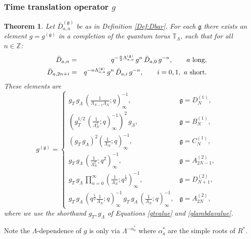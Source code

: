 \documentclass[12pt]{amsart}
\newtheorem{thm}{Theorem}[section]
\newcommand{\barD}{\bar D}
\newcommand{\g}{{\mathfrak{g}}}
\newcommand{\Z}{{\mathbb Z}}
\newcommand{\lL}{{\Lambda}}
\numberwithin{equation}{section}
\begin{document}
\subsubsection{Time translation operator $g$}
%
%
%
%
%
\begin{thm}\label{longshort}
Let $\barD_{a,n}^{(\g)}$ be as in Definition \ref{Def:Dbar}.
For each $\g$ there exists an element $g=g^{(\g)}$ in a completion of the quantum torus ${\mathbb T}_\lL$, such that for all $n\in \Z$:
\begin{eqnarray}
\barD_{a,n}&=&q^{-\frac{n}{2}\lL^{(\g)}_{a,a}}\, g^n\, \barD_{a,0} \, g^{-n} , \qquad \hbox{$a$ long},\label{evolutlong}\\
\barD_{a,2n+i}&=&q^{-n\lL^{(\g)}_{a,a}}\, g^n\, \barD_{a,i} \, g^{-n},\qquad i=0,1\label{evolutshort} , \ \hbox{$a$ short}.
\end{eqnarray}
These elements are
%
\begin{equation}
\renewcommand{\arraystretch}{2.5}
g^{(\g)} =\left\{
\begin{array}{ll}
g_T\, g_\lL \,  \left(\frac{1}{\lL_{N-1}\lL_N};q\right)^{-1}_\infty, & \g=D_N^{(1)},\\
\left(g_T^{1/2}\,  \left(\frac{1}{\lL_N^2};q\right)^{-1}_\infty \right)^2\, g_\lL,&  \g=B_N^{(1)},  \\
(g_T \,g_\lL)^2  \left(\frac{1}{\lL_N};q\right)^{-1}_\infty, & \g=C_N^{(1)}, \\
g_T\, g_\lL\,  \left(\frac{1}{\lL_N^2};q^2\right)^{-1}_\infty, &  \g=A_{2N-1}^{(2)} ,\\
g_T\, g_\lL\, \prod_{n=0}^\infty \left(\frac{1}{\lL_N};q^{\frac12}\right)_\infty^{-1}, &  \g=D_{N+1}^{(2)},\\
 g_T\, g_\lL\, \left(q^{\frac{1}{2}}\frac{1}{\lL_N};q\right)^{-1}_\infty\,
g_T\, g_\lL\, \left(\frac{1}{\lL_N};q\right)_\infty^{-1}, & \g=A_{2N}^{(2)} ,
\end{array}\right.
\label{variousg}
\end{equation}
where we use the shorthand $g_T, g_\Lambda$ of Equations \eqref{gtvalue} and \eqref{glambdavalue}.
\end{thm}
%
%
%
%
%
%
%
%
%
%
%
Note the $\Lambda$-dependence of $g$ is only via $\Lambda^{-\alpha_a^*}$ where $\alpha_a^*$ are the simple roots of $R^*$.
\end{document}
